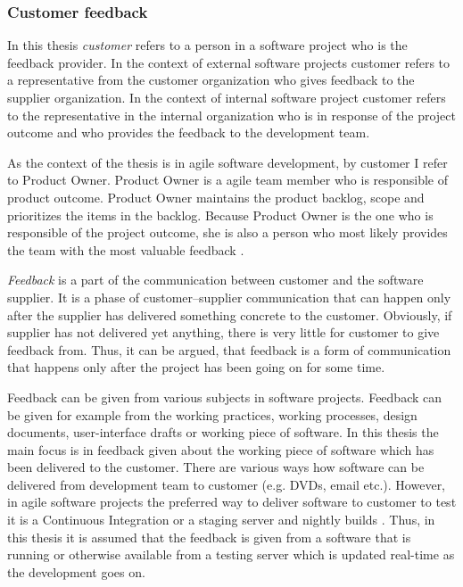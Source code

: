 \documentclass[english,12pt,a4paper,pdftex]{article}
\begin{document}
\subsubsection{Customer feedback}

In this thesis \textit{customer} refers to a person in a software project who is the feedback provider. In the context of external software projects customer refers to a representative from the customer organization who gives feedback to the supplier organization. In the context of internal software project customer refers to the representative in the internal organization who is in response of the project outcome and who provides the feedback to the development team.

As the context of the thesis is in agile software development, by customer I refer to Product Owner. Product Owner is a agile team member who is responsible of product outcome. Product Owner maintains the product backlog, scope and prioritizes the items in the backlog. Because Product Owner is the one who is responsible of the project outcome, she is also a person who most likely provides the team with the most valuable feedback \citep{pichler2010}.

\textit{Feedback} is a part of the communication between customer and the software supplier. It is a phase of customer--supplier communication that can happen only after the supplier has delivered something concrete to the customer. Obviously, if supplier has not delivered yet anything, there is very little for customer to give feedback from. Thus, it can be argued, that feedback is a form of communication that happens only after the project has been going on for some time.

Feedback can be given from various subjects in software projects. Feedback can be given for example from the working practices, working processes, design documents, user-interface drafts or working piece of software. In this thesis the main focus is in feedback given about the working piece of software which has been delivered to the customer. There are various ways how software can be delivered from development team to customer (e.g. DVDs, email etc.). However, in agile software projects the preferred way to deliver software to customer to test it is a Continuous Integration or a staging server and nightly builds \citep{shore2007} \citep{beck2004}. Thus, in this thesis it is assumed that the feedback is given from a software that is running or otherwise available from a testing server which is updated real-time as the development goes on.
\end{document}
